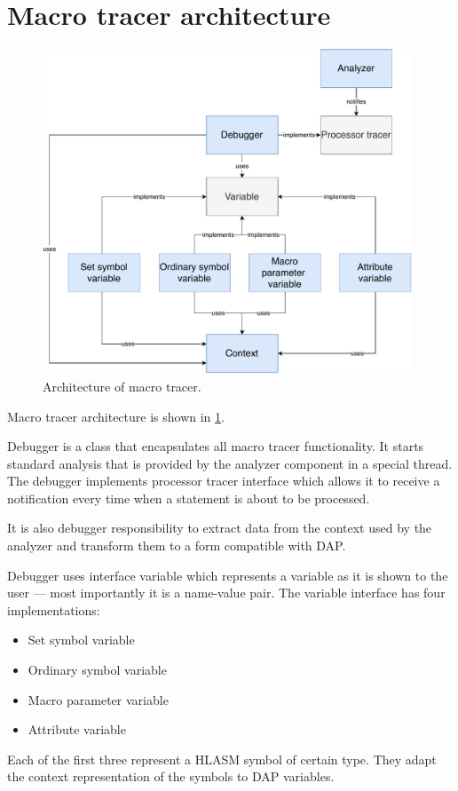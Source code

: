 \section{Macro tracer architecture}
\begin{figure}
	\centering
	\includegraphics[width=11cm]{img/macro_tracer_arch}
	\caption{Architecture of macro tracer.}
	\label{macro_tracer_arch}
\end{figure}

Macro tracer architecture is shown in \cref{macro_tracer_arch}.

Debugger is a class that encapsulates all macro tracer functionality. It starts standard analysis that is provided by the analyzer component in a special thread. The debugger implements processor tracer interface which allows it to receive a notification every time when a statement is about to be processed.

It is also debugger responsibility to extract data from the context used by the analyzer and transform them to a form compatible with DAP.

Debugger uses interface variable which represents a variable as it is shown to the user --- most importantly it is a name-value pair. The variable interface has four implementations:
\begin{itemize}
	\item Set symbol variable
	\item Ordinary symbol variable
	\item Macro parameter variable
	\item Attribute variable
\end{itemize}
Each of the first three represent a HLASM symbol of certain type. They adapt the context representation of the symbols to DAP variables.

